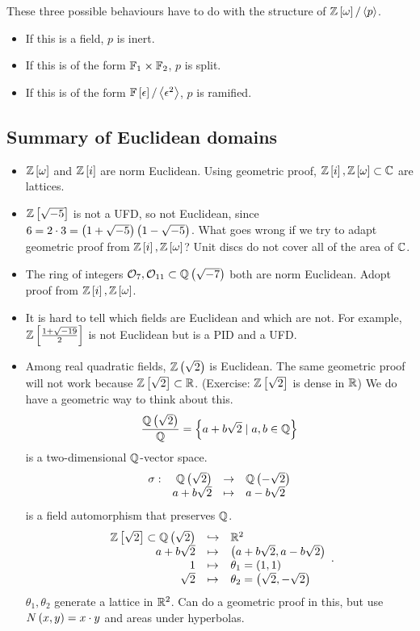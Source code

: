 \begin{remark*}
These three possible behaviours have to do with the structure of $ \mathbb{Z}\left[ \omega \right] / \left\langle p \right\rangle $.
\begin{itemize}
\item If this is a field, $ p $ is inert.
\item If this is of the form $ \mathbb{F}_1 \times \mathbb{F}_2 $, $ p $ is split.
\item If this is of the form $ \mathbb{F}\left[ \epsilon \right] / \left\langle \epsilon^2 \right\rangle $, $ p $ is ramified.
\end{itemize}
\end{remark*}

\pagebreak

\subsection{Summary of Euclidean domains}

\begin{itemize}
\item $ \mathbb{Z}\left[ \omega \right] $ and $ \mathbb{Z}\left[ i \right] $ are norm Euclidean. Using geometric proof, $ \mathbb{Z}\left[ i \right], \mathbb{Z}\left[ \omega \right] \subset \mathbb{C} $ are lattices.
\item $ \mathbb{Z}\left[ \sqrt{-5} \right] $ is not a UFD, so not Euclidean, since $ 6 = 2 \cdot 3 = \left( 1 + \sqrt{-5} \right)\left( 1 - \sqrt{-5} \right) $. What goes wrong if we try to adapt geometric proof from $ \mathbb{Z}\left[ i \right], \mathbb{Z}\left[ \omega \right] $? Unit discs do not cover all of the area of $ \mathbb{C} $.
\item The ring of integers $ \mathcal{O}_7, \mathcal{O}_{11} \subset \mathbb{Q}\left( \sqrt{-7} \right) $ both are norm Euclidean. Adopt proof from $ \mathbb{Z}\left[ i \right], \mathbb{Z}\left[ \omega \right] $.
\item It is hard to tell which fields are Euclidean and which are not. For example, $ \mathbb{Z}\left[ \tfrac{1 + \sqrt{-19}}{2} \right] $ is not Euclidean but is a PID and a UFD.
\item Among real quadratic fields, $ \mathbb{Z}\left( \sqrt{2} \right) $ is Euclidean. The same geometric proof will not work because $ \mathbb{Z}\left[ \sqrt{2} \right] \subset \mathbb{R} $. (Exercise: $ \mathbb{Z}\left[ \sqrt{2} \right] $ is dense in $ \mathbb{R} $) We do have a geometric way to think about this.
$$ \dfrac{\mathbb{Q}\left( \sqrt{2} \right)}{\mathbb{Q}} = \left\{ a + b\sqrt{2} \mid a, b \in \mathbb{Q} \right\} $$
is a two-dimensional $ \mathbb{Q} $-vector space.
$$ \function[\sigma]{\Q\rb{\sqrt{2}}}{\Q\rb{-\sqrt{2}}}{a + b\sqrt{2}}{a - b\sqrt{2}} $$
is a field automorphism that preserves $ \mathbb{Q} $.
$$
\begin{array}{rcl}
\mathbb{Z}\left[ \sqrt{2} \right] \subset \mathbb{Q}\left( \sqrt{2} \right) & \hookrightarrow & \mathbb{R}^2 \\
a + b\sqrt{2} & \mapsto & \left( a + b\sqrt{2}, a - b\sqrt{2} \right) \\
1 & \mapsto & \theta_1 = \left( 1, 1 \right) \\
\sqrt{2} & \mapsto & \theta_2 = \left( \sqrt{2}, -\sqrt{2} \right)
\end{array}.
$$
$ \theta_1, \theta_2 $ generate a lattice in $ \mathbb{R}^2 $. Can do a geometric proof in this, but use $ N\left( x, y \right) = x \cdot y $ and areas under hyperbolas.
\end{itemize}

